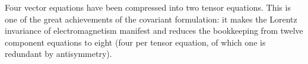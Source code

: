 Four vector equations have been compressed into two tensor equations. This is one of the great achievements of the covariant formulation: it makes the Lorentz invariance of electromagnetism manifest and reduces the bookkeeping from twelve component equations to eight (four per tensor equation, of which one is redundant by antisymmetry).
